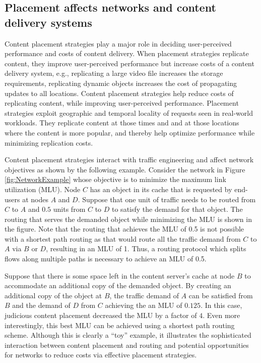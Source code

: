 %

\subsection{Placement affects networks and content delivery systems}

Content placement strategies play a major role in deciding user-perceived performance and costs of content delivery. When placement strategies replicate content, they improve user-perceived performance but increase costs of a content delivery system, e.g., replicating a large video file increases the storage requirements, replicating dynamic objects increases the cost of propagating updates to all locations.  Content placement strategies help reduce costs of replicating content, while improving user-perceived performance. Placement strategies exploit geographic and temporal locality of requests seen in real-world workloads\cite{NCDN,youtubeUGC,vodP2Pbenefit,cellularvideotraffic}. They replicate content at those times and and at those locations where the content is more popular, and thereby help optimize performance while minimizing replication costs.

Content placement strategies interact with traffic engineering and affect network objectives as shown by the following example. Consider the network in Figure \ref{fig:NetworkExample} whose objective is to minimize the maximum link utilization (MLU). Node $C$ has an object in its cache that is requested by end-users at nodes $A$ and $D$. Suppose that one unit of traffic needs to be routed from $C$ to $A$ and $0.5$ units  from $C$ to $D$ to satisfy the demand for that object. The routing that serves the demanded object while minimizing the MLU is shown in the figure. 
Note that the routing that achieves the MLU of 0.5 is not possible with a shortest path routing as that would route all the traffic demand from $C$ to $A$ via $B$ or $D$, resulting in an MLU of 1. Thus, a routing protocol which splits flows along multiple paths is necessary to achieve an MLU of 0.5.

Suppose that there is some space left in the content server's cache at node $B$ to accommodate an additional copy of the demanded object. By creating an additional copy of the object at $B$, the traffic demand of $A$ can be satisfied from $B$ and the demand of $D$ from $C$ achieving the an MLU of $0.125$. In this case, judicious content placement decreased the MLU by a factor of $4$.  Even more interestingly, this best MLU can be achieved using a shortest path routing scheme. Although this is clearly a ``toy'' example, it illustrates the sophisticated interaction between content placement and routing and potential opportunities for networks to reduce costs via effective placement strategies.


